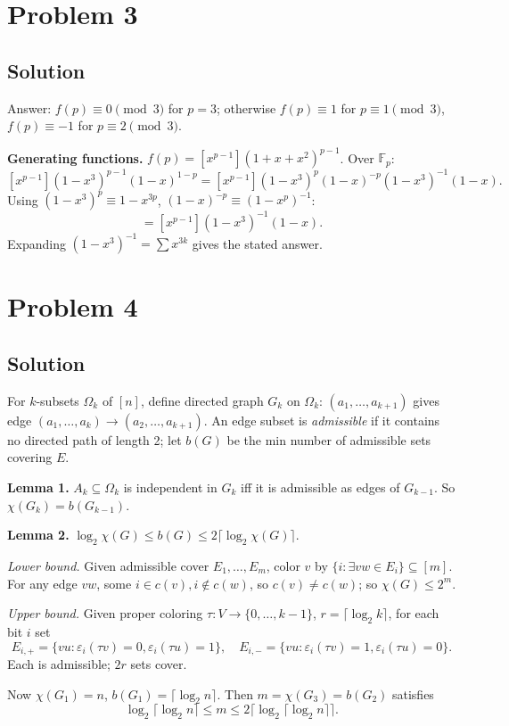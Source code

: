 \documentclass{article}
\begin{document}
\section*{Problem 3}
\subsection*{Solution}
Answer: $f(p) \equiv 0 \pmod 3$ for $p = 3$; otherwise $f(p) \equiv 1$ for $p \equiv 1 \pmod 3$, $f(p) \equiv -1$ for $p \equiv 2 \pmod 3$.

\textbf{Generating functions.} $f(p) = [x^{p-1}](1 + x + x^2)^{p-1}$. Over $\mathbb{F}_p$:
\[ [x^{p-1}](1-x^3)^{p-1}(1-x)^{1-p} = [x^{p-1}](1 - x^3)^p (1-x)^{-p} (1 - x^3)^{-1}(1-x). \]
Using $(1-x^3)^p \equiv 1 - x^{3p}$, $(1-x)^{-p} \equiv (1 - x^p)^{-1}$:
\[ = [x^{p-1}](1 - x^3)^{-1}(1-x). \]
Expanding $(1-x^3)^{-1} = \sum x^{3k}$ gives the stated answer.

\section*{Problem 4}
\subsection*{Solution}
For $k$-subsets $\Omega_k$ of $[n]$, define directed graph $G_k$ on $\Omega_k$: $(a_1,\ldots,a_{k+1})$ gives edge $(a_1,\ldots,a_k) \to (a_2,\ldots,a_{k+1})$. An edge subset is \emph{admissible} if it contains no directed path of length 2; let $b(G)$ be the min number of admissible sets covering $E$.

\textbf{Lemma 1.} $A_k \subseteq \Omega_k$ is independent in $G_k$ iff it is admissible as edges of $G_{k-1}$. So $\chi(G_k) = b(G_{k-1})$.

\textbf{Lemma 2.} $\log_2 \chi(G) \leq b(G) \leq 2\lceil \log_2 \chi(G) \rceil$.

\emph{Lower bound.} Given admissible cover $E_1, \ldots, E_m$, color $v$ by $\{i : \exists vw \in E_i\} \subseteq [m]$. For any edge $vw$, some $i \in c(v), i \notin c(w)$, so $c(v) \neq c(w)$; so $\chi(G) \leq 2^m$.

\emph{Upper bound.} Given proper coloring $\tau: V \to \{0,\ldots,k-1\}$, $r = \lceil \log_2 k \rceil$, for each bit $i$ set
\[ E_{i,+} = \{vu : \varepsilon_i(\tau v) = 0, \varepsilon_i(\tau u) = 1\}, \quad E_{i,-} = \{vu : \varepsilon_i(\tau v) = 1, \varepsilon_i(\tau u) = 0\}. \]
Each is admissible; $2r$ sets cover.

Now $\chi(G_1) = n$, $b(G_1) = \lceil \log_2 n \rceil$. Then $m = \chi(G_3) = b(G_2)$ satisfies
\[ \log_2 \lceil \log_2 n \rceil \leq m \leq 2 \lceil \log_2 \lceil \log_2 n \rceil \rceil. \]
\end{document}

